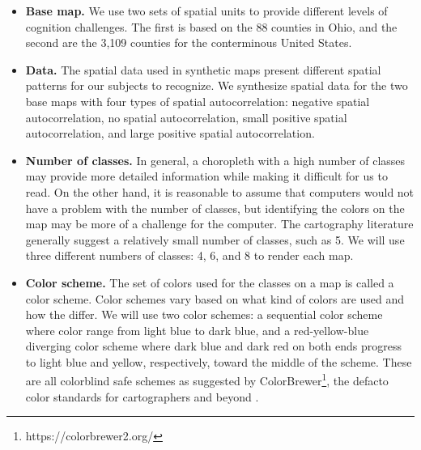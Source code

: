 \begin{itemize}
    \item {\bf Base map.} We use two sets of spatial units to provide different levels of cognition challenges. The first is based on the 88 counties in Ohio, and the second are the 3,109 counties for the conterminous United States.

    \item {\bf Data.} The spatial data used in synthetic maps present different spatial patterns for our subjects to recognize. We synthesize spatial data for the two base maps with four types of spatial autocorrelation: negative spatial autocorrelation, no spatial autocorrelation, small positive spatial autocorrelation, and large positive spatial autocorrelation.

    \item {\bf Number of classes.} In general, a choropleth with a high number of classes may provide more detailed information while making it difficult for us to read. On the other hand, it is reasonable to assume that computers would not have a problem with the number of classes, but identifying the colors on the map may be more of a challenge for the computer. The cartography literature generally suggest a relatively small number of classes, such as 5. We will use three different numbers of classes: 4, 6, and 8 to render each map.

    \item {\bf Color scheme.} The set of colors used for the classes on a map is called a color scheme. Color schemes vary based on what kind of colors are used and how the differ. We will use two color schemes: a sequential color scheme where color range from light blue to dark blue, and a red-yellow-blue diverging color scheme where dark blue and dark red on both ends progress to light blue and yellow, respectively, toward the middle of the scheme. These are all colorblind safe schemes as suggested by ColorBrewer\footnote{https://colorbrewer2.org/}, the defacto color standards for cartographers and beyond \citep{harrower2003colorbrewer}.
\end{itemize}


